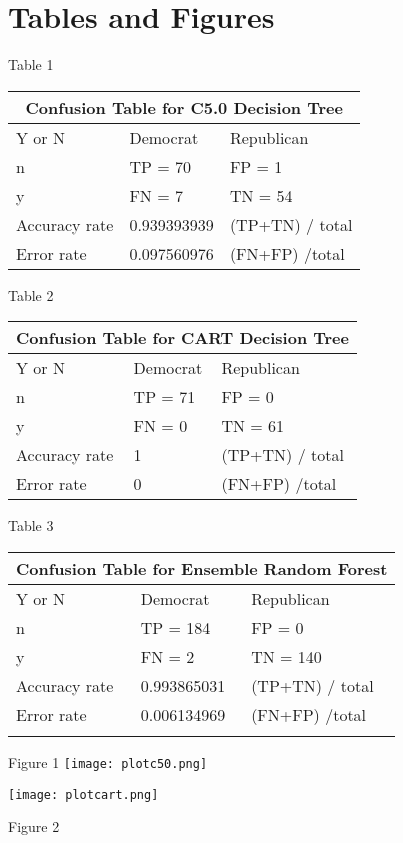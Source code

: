 \documentclass{article}
\begin{document}
\section{Tables and Figures}
%
\vskip 0.2in
Table 1
\vskip 0.2in
\begin{tabular}{ |p{3cm}||p{3cm}|p{3cm}|  }
 \hline
 \multicolumn{3}{|c|}{Confusion Table for C5.0 Decision Tree } \\
 \hline
 Y or N     & Democrat &Republican\\
 \hline
 n   & TP = 70    &FP = 1\\
 y &   FN = 7   &TN = 54\\
 \hline
Accuracy rate   &0.939393939 &(TP+TN) / total \\
Error rate  &0.097560976  &(FN+FP) /total \\
 \hline
\end{tabular}

%
\vskip 0.2in
Table 2
\vskip 0.2in
\begin{tabular}{ |p{3cm}||p{3cm}|p{3cm}|  }
 \hline
 \multicolumn{3}{|c|}{Confusion Table for CART Decision Tree } \\
 \hline
 Y or N     & Democrat &Republican\\
 \hline
 n   & TP = 71    &FP = 0\\
 y &   FN = 0   &TN = 61\\
 \hline
Accuracy rate   &1 &(TP+TN) / total \\
Error rate  &0  &(FN+FP) /total \\
 \hline
\end{tabular}

%
\vskip 0.2in
Table 3
\vskip 0.2in
\begin{tabular}{ |p{3cm}||p{3cm}|p{3cm}|  }
 \hline
 \multicolumn{3}{|c|}{Confusion Table for Ensemble Random Forest } \\
 \hline
 Y or N     & Democrat &Republican\\
 \hline
 n   & TP = 184    &FP = 0\\
 y &   FN = 2   &TN = 140\\
 \hline
Accuracy rate   &0.993865031 &(TP+TN) / total \\
Error rate  &0.006134969  &(FN+FP) /total \\
 \hline


\pagebreak{}
\end{tabular}


\vskip 0.2in
Figure 1
\texttt{[image: plotc50.png]}
\vskip 0.2in

%
\vskip 0.2in

%
\vskip 0.2in
\texttt{[image: plotcart.png]}

Figure 2
\end{document}
